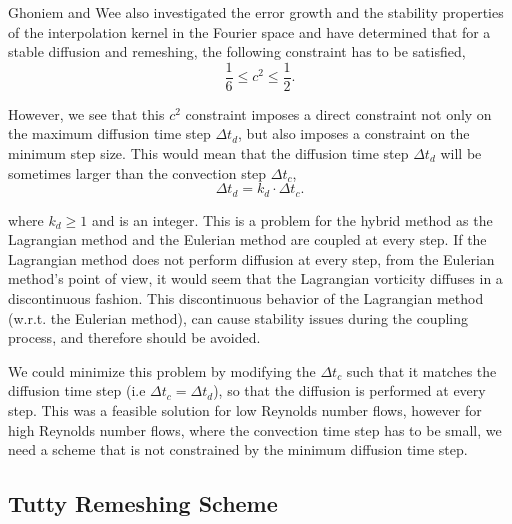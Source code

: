 Ghoniem and Wee also investigated the error growth and the stability properties of the interpolation kernel in the Fourier space and have determined that for a stable diffusion and remeshing, the following constraint has to be satisfied,
	\begin{equation}
	\frac{1}{6} \leqslant c^2 \leqslant \frac{1}{2}.
	\label{eq:c2stability}
	\end{equation}

However, we see that this $c^2$ constraint imposes a direct constraint not only on the maximum diffusion time step $\Delta t_d$, but also imposes a constraint on the minimum step size. This would mean that the diffusion time step $\Delta t_d$ will be sometimes larger than the convection step $\Delta t_c$,
	\begin{equation}
	\Delta t_d = k_d \cdot \Delta t_c.
	\label{eq:la_dtcts}
	\end{equation}

where $k_d \geqslant 1$ and is an integer. This is a problem for the hybrid method as the Lagrangian method and the Eulerian method are coupled at every step. If the Lagrangian method does not perform diffusion at every step, from the Eulerian method's point of view, it would seem that the Lagrangian vorticity diffuses in a discontinuous fashion. This discontinuous behavior of the Lagrangian method (w.r.t. the Eulerian method), can cause stability issues during the coupling process, and therefore should be avoided.

We could minimize this problem by modifying the $\Delta t_c$ such that it matches the diffusion time step (i.e $\Delta t_c = \Delta t_d$), so that the diffusion is performed at every step. This was a feasible solution for low Reynolds number flows, however for high Reynolds number flows, where the convection time step has to be small, we need a scheme that is not constrained by the minimum diffusion time step.

\subsection{Tutty Remeshing Scheme}
\label{subsubsec:srs}

